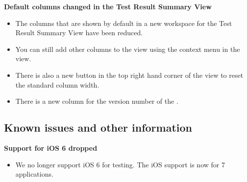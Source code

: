 \textbf{Default columns changed in the Test Result Summary View}
\begin{itemize}
\item The columns that are shown by default in a new workspace for the Test Result Summary View have been reduced.
\item You can still add other columns to the view using the context menu in the view.
\item There is also a new button in the top right hand corner of the view to reset the standard column width.
\item There is a new column for the version number of the \gdproject{}.
\end{itemize}



\subsection{Known issues and other information}
\textbf{Support for iOS 6 dropped}
\begin{itemize}
\item We no longer support iOS 6 for testing. The iOS support is now for 7 applications. 
\end{itemize}
